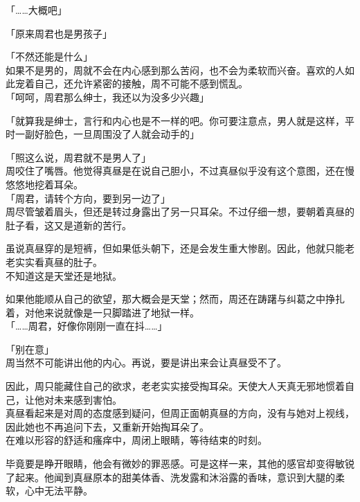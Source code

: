 「……大概吧」

「原来周君也是男孩子」

「不然还能是什么」\\

如果不是男的，周就不会在内心感到那么苦闷，也不会为柔软而兴奋。喜欢的人如此宠着自己，还允许紧密的接触，周不可能不感到慌乱。\\

「呵呵，周君那么绅士，我还以为没多少兴趣」

「就算我是绅士，言行和内心也是不一样的吧。你可要注意点，男人就是这样，平时一副好脸色，一旦周围没了人就会动手的」

「照这么说，周君就不是男人了」\\

周咬住了嘴唇。他觉得真昼是在说自己胆小，不过真昼似乎没有这个意图，还在慢悠悠地挖着耳朵。\\

「周君，请转个方向，要到另一边了」\\

周尽管皱着眉头，但还是转过身露出了另一只耳朵。不过仔细一想，要朝着真昼的肚子看，这又是道新的苦行。

虽说真昼穿的是短裤，但如果低头朝下，还是会发生重大惨剧。因此，他就只能老老实实看真昼的肚子。\\

不知道这是天堂还是地狱。

如果他能顺从自己的欲望，那大概会是天堂；然而，周还在踌躇与纠葛之中挣扎着，对他来说就像是一只脚踏进了地狱一样。\\

「……周君，好像你刚刚一直在抖……」

「别在意」\\

周当然不可能讲出他的内心。再说，要是讲出来会让真昼受不了。

因此，周只能藏住自己的欲求，老老实实接受掏耳朵。天使大人天真无邪地惯着自己，让他对未来感到害怕。\\

真昼看起来是对周的态度感到疑问，但周正面朝真昼的方向，没有与她对上视线，因此她也不再追问下去，又重新开始掏耳朵了。\\

在难以形容的舒适和瘙痒中，周闭上眼睛，等待结束的时刻。

毕竟要是睁开眼睛，他会有微妙的罪恶感。可是这样一来，其他的感官却变得敏锐了起来。他闻到真昼原本的甜美体香、洗发露和沐浴露的香味，意识到大腿的柔软，心中无法平静。\\


